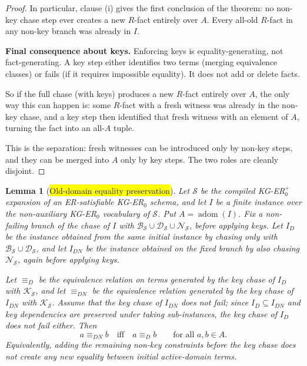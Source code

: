 \documentclass[10pt]{article}
\newtheorem{lemma}{Lemma}
\begin{document}
\begin{proof}
In particular, clause (i) gives the first conclusion of the theorem:
no non-key chase step ever creates a new \(R\)-fact entirely over
\(A\).  Every all-old \(R\)-fact in any non-key branch was already
in \(I\).

\smallskip\noindent\textbf{Final consequence about keys.}
Enforcing keys is equality-generating, not fact-generating.  A key
step either identifies two terms (merging equivalence classes) or
fails (if it requires impossible equality).  It does not add or
delete facts.

So if the full chase (with keys) produces a new \(R\)-fact entirely
over \(A\), the only way this can happen is: some \(R\)-fact with a
fresh witness was already in the non-key chase, and a key step then
identified that fresh witness with an element of \(A\), turning the
fact into an all-\(A\) tuple.

This is the separation: fresh witnesses can be introduced only by
non-key steps, and they can be merged into \(A\) only by key steps.
The two roles are cleanly disjoint.
\end{proof}

\begin{lemma}[\colorbox{yellow}{Old-domain equality preservation}]
\label{lem:kger-old-domain-equality}
Let \(\mathcal S\) be the compiled KG-ER\(_0^+\) expansion of an
ER-satisfiable KG-ER\(_0\) schema, and let \(I\) be a finite instance
over the non-auxiliary KG-ER\(_0\) vocabulary of \(\mathcal S\).  Put
\(A=\operatorname{adom}(I)\).  Fix a non-failing branch of the chase of
\(I\) with
\(\mathcal B_{\mathcal S}\cup\mathcal D_{\mathcal S}\cup
\mathcal N_{\mathcal S}\), before applying keys.  Let \(I_D\) be the
instance obtained from the same initial instance by chasing only with
\(\mathcal B_{\mathcal S}\cup\mathcal D_{\mathcal S}\), and let
\(I_{DN}\) be the instance obtained on the fixed branch by also chasing
\(\mathcal N_{\mathcal S}\), again before applying keys.

Let \(\equiv_D\) be the equivalence relation on terms generated by the
key chase of \(I_D\) with \(\mathcal K_{\mathcal S}\), and let
\(\equiv_{DN}\) be the equivalence relation generated by the key chase of
\(I_{DN}\) with \(\mathcal K_{\mathcal S}\).  Assume that the key chase
of \(I_{DN}\) does not fail; since \(I_D\subseteq I_{DN}\) and key
dependencies are preserved under taking sub-instances, the key chase of
\(I_D\) does not fail either.  Then
\[
a\equiv_{DN} b \quad\text{iff}\quad a\equiv_D b
\qquad\text{for all }a,b\in A .
\]
Equivalently, adding the remaining non-key constraints before the key
chase does not create any new equality between initial active-domain
terms.
\end{lemma}
\end{document}
